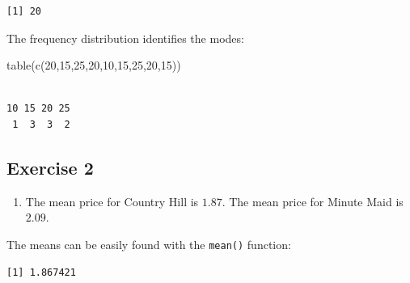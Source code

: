 \documentclass[
  letterpaper,
  DIV=11,
  numbers=noendperiod]{scrreprt}
\newenvironment{Shaded}{\begin{snugshade}}{\end{snugshade}}
\newcommand{\DecValTok}[1]{\textcolor[rgb]{0.68,0.00,0.00}{#1}}
\newcommand{\FunctionTok}[1]{\textcolor[rgb]{0.28,0.35,0.67}{#1}}
\newcommand{\NormalTok}[1]{\textcolor[rgb]{0.00,0.23,0.31}{#1}}
\newcommand{\SpecialCharTok}[1]{\textcolor[rgb]{0.37,0.37,0.37}{#1}}
\providecommand{\tightlist}{%
  \setlength{\itemsep}{0pt}\setlength{\parskip}{0pt}}\usepackage{longtable,booktabs,array}
\begin{document}
\begin{verbatim}
[1] 20
\end{verbatim}

The frequency distribution identifies the modes:

\begin{Shaded}
\begin{Highlighting}[numbers=left,,]
\FunctionTok{table}\NormalTok{(}\FunctionTok{c}\NormalTok{(}\DecValTok{20}\NormalTok{,}\DecValTok{15}\NormalTok{,}\DecValTok{25}\NormalTok{,}\DecValTok{20}\NormalTok{,}\DecValTok{10}\NormalTok{,}\DecValTok{15}\NormalTok{,}\DecValTok{25}\NormalTok{,}\DecValTok{20}\NormalTok{,}\DecValTok{15}\NormalTok{))}
\end{Highlighting}
\end{Shaded}

\begin{verbatim}

10 15 20 25 
 1  3  3  2 
\end{verbatim}

\hypertarget{exercise-2-5}{%
\subsection*{Exercise 2}\label{exercise-2-5}}

\begin{blackbox}

\begin{enumerate}
\def\labelenumi{\arabic{enumi}.}
\tightlist
\item
  The mean price for Country Hill is \(1.87\). The mean price for Minute
  Maid is \(2.09\).
\end{enumerate}

\end{blackbox}

The means can be easily found with the \texttt{mean()} function:

\begin{Shaded}
\end{Shaded}

\begin{verbatim}
[1] 1.867421
\end{verbatim}

\begin{Shaded}
\end{Shaded}
\end{document}
